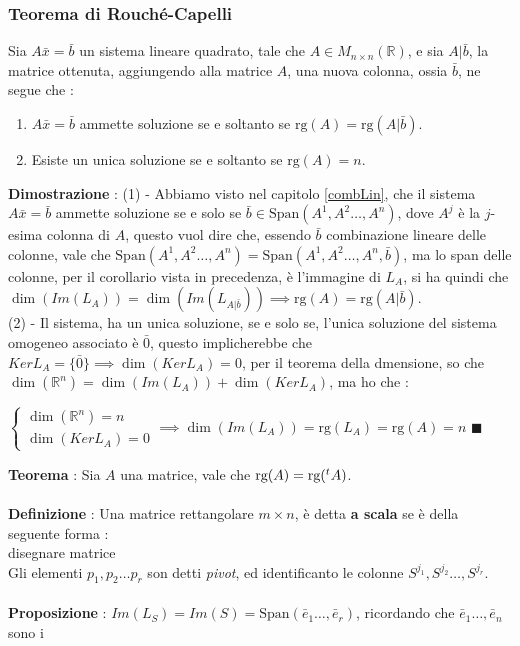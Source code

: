 \documentclass[12pt, letterpaper]{article}
\newcommand{\R}{{\mathbb R}}
\newcommand{\rg}{{\text{rg}}}
\newcommand{\acc}{\\\hphantom{}\\}
\newcommand{\Span}{{\text{Span}}}
\begin{document}
\subsubsection{Teorema di Rouché-Capelli}
Sia \(A\bar x=\bar b\) un sistema lineare quadrato, tale che \(A\in M_{n\times n}(\R)\), e sia \(A|\bar b\), la matrice 
ottenuta, aggiungendo alla matrice \(A\), una nuova colonna, ossia \(\bar b\), ne segue che :\begin{enumerate}
    \item \(A\bar x=\bar b\) ammette soluzione se e soltanto se \(\rg(A)=\rg(A|\bar b)\).
    \item Esiste un unica soluzione se e soltanto se \(\rg(A)=n\).
\end{enumerate}
\textbf{Dimostrazione} : (1) - Abbiamo visto nel capitolo \ref{combLin}, che il sistema \(A\bar x=\bar b\) ammette 
soluzione se e solo se \(\bar b \in \Span(A^1,A^2\dots, A^n)\), dove \(A^j\) è la \(j\)-esima colonna di \(A\), questo vuol dire 
che, essendo \(\bar b\) combinazione lineare delle colonne, vale che \(\Span(A^1,A^2\dots, A^n)=\Span(A^1,A^2\dots, A^n,\bar b)\), ma 
lo span delle colonne, per il corollario vista in precedenza, è l'immagine di \(L_A\), si ha quindi che 
\(\dim(Im(L_A))=\dim(Im(L_{A|\bar b}))\implies \rg(A)=\rg(A|\bar b)\).\\ 
(2) - Il sistema, ha un unica soluzione, se e solo se, l'unica soluzione del sistema omogeneo associato è \(\bar 0\), 
questo implicherebbe che \(KerL_A=\{\bar 0\}\implies \dim(KerL_A)=0\), per il teorema della dmensione, so che 
\(\dim(\R^n)=\dim(Im(L_A))+\dim(KerL_A)\), ma ho che :\begin{center}\(
    \begin{cases}
        \dim(\R^n)=n\\\dim(KerL_A)=0
    \end{cases}\implies \dim(Im(L_A))=\rg(L_A)=\rg(A)=n
\)\hphantom{text} \(\blacksquare\)\end{center} 
\textbf{Teorema }: Sia \(A\) una matrice, vale che \(\rg(A)=\rg(\text{\hphantom{}}^tA)\).\acc 
\textbf{Definizione }: Una matrice rettangolare \(m\times n\), è detta \textbf{a scala} se è della 
seguente forma :  \\
\color{red} disegnare matrice \color{black}\\
Gli elementi \(p_1,p_2\dots p_r\) son detti \textit{pivot}, ed identificanto le colonne \(S^{j_1},S^{j_2}\dots,S^{j_r}\).\acc 
\textbf{Proposizione} : \(Im(L_S)=Im(S)=\Span(\bar e_1\dots,\bar e_r)\), ricordando che \(\bar e_1\dots,\bar e_n\) sono i 
\end{document}

